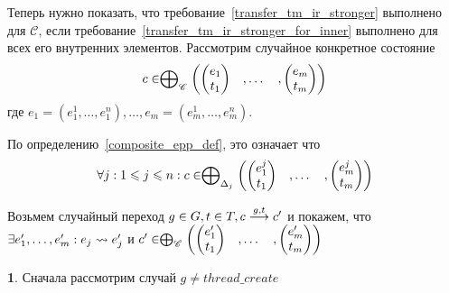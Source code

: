 Теперь нужно показать, что требование~\ref{transfer_tm_ir_stronger} выполнено для $\mathscr{C}$, если требование~\ref{transfer_tm_ir_stronger_for_inner} выполнено для всех его внутренних элементов. 
Рассмотрим случайное конкретное состояние
$$c \in  \mathrel{\bigoplus}_{\mathscr{C}}
\begin{pmatrix}
\begin{pmatrix}
e_1 \\
t_1 
\end{pmatrix}& ,
\dots& ,
\begin{pmatrix}
e_m \\
t_m 
\end{pmatrix}
\end{pmatrix}$$
где $e_1=(e^1_1, \dots, e^n_1), \dots, e_m=(e^1_m, \dots, e^n_m)$.

По определению~\ref{composite_epp_def}, это означает что
$$\forall j: 1\leqslant j \leqslant n: c \in  \mathrel{\bigoplus}_{\Delta_j}
\begin{pmatrix}
\begin{pmatrix}
e^j_1 \\
t_1 
\end{pmatrix}& ,
\dots& ,
\begin{pmatrix}
e^j_m \\
t_m 
\end{pmatrix}
\end{pmatrix}$$

Возьмем случайный переход
$ g \in G, t \in T, c \stackrel{g,t}{\longrightarrow} c'$ и покажем, что 
$\exists e_1', \dots, e_m': e_j \leadsto e_j'$ и
$c' \in  \mathrel{\bigoplus}_{\mathscr{C}}
\begin{pmatrix}
\begin{pmatrix}
e_1' \\
t_1 
\end{pmatrix}& ,
\dots& ,
\begin{pmatrix}
e_m' \\
t_m 
\end{pmatrix}
\end{pmatrix}$

{\textbf 1.} Сначала рассмотрим случай $g \neq thread\_create$

